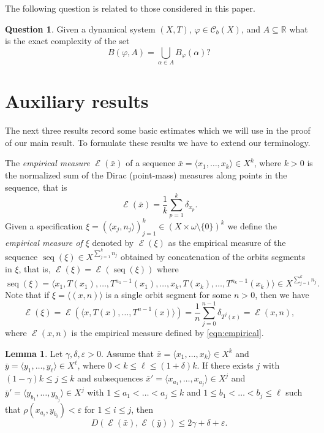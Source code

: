 \documentclass{amsart}
\theoremstyle{definition}
\newtheorem{lem}[thm]{Lemma}
\newtheorem*{ques*}{Question}
\newcommand{\cC}{\mathcal{C}}
\DeclareMathOperator{\Emp}{\mathcal{E}}%
\DeclareMathOperator{\seq}{seq}
\renewcommand{\phi}{\varphi}
\DeclareMathOperator{\MT}{\mathcal{M}_{\mathit T} }
\newcommand{\weakst}{weak$^*$}
\newcommand{\eps}{\varepsilon}
\newcommand{\R}{\mathbb{R}}
\begin{document}
The following question is related to those considered in this paper.


\begin{ques*} \label{ques:gq}
Given a dynamical system $(X,T)$, $\varphi\in \cC_b(X)$, and
$A\subseteq \R$ what is the exact complexity of the set
\[
B(\varphi,A)=\bigcup_{\alpha\in A}B_\phi(\alpha)?
\]
\end{ques*}








\section{Auxiliary results}\label{sec:aux}
The next three results record some basic estimates which we will use in the proof of our main result.
To formulate these results we have to extend our terminology.

The {\em empirical measure} $\Emp(\bar x)$ of a sequence $\bar x=\langle x_1,\ldots,x_k\rangle\in X^k$, where $k>0$
is the normalized sum of the Dirac (point-mass) measures along points in the sequence, that is
\[
\Emp(\bar x)=\frac{1}{k}\sum_{p=1}^{k}\delta_{x_p}.
\]
Given a specification $\xi=(\langle x_j,n_j\rangle)_{j=1}^k\in (X\times \omega\setminus\{0\})^k$ we define the \emph{empirical measure of $\xi$} denoted by $\Emp(\xi)$ as the empirical measure of the sequence $\seq(\xi)\in X^{\sum_{j=1}^kn_j}$ obtained by concatenation of the orbits segments in $\xi$, that is,
$\Emp(\xi)=\Emp(\seq(\xi))$  where
\[
\seq(\xi)=\langle x_1,T(x_1),\ldots, T^{n_1-1}(x_1),\ldots,x_k,T(x_k),\ldots,T^{n_k-1}(x_k)\rangle\in X^{\sum_{j=1}^kn_j}.
\]
Note that if $\xi=\langle (x,n)\rangle$ is a single orbit segment for some $n>0$, then we have
\[
\Emp(\xi)=\Emp(\langle x,T(x),\ldots, T^{n-1}(x)\rangle)=
\frac{1}{n}\sum_{j=0}^{n-1}\delta_{T^j(x)}=\Emp(x,n),
\]
where $\Emp(x,n)$ is the empirical measure defined by \eqref{eqn:empirical}.


\begin{lem}\label{lem:close-segments}
Let $\gamma,\delta,\eps>0$. Assume that
$\bar x=\langle x_1,\ldots,x_k\rangle\in X^k$ and
$\bar y=\langle y_1,\ldots,y_\ell\rangle\in X^\ell$, where $0<k\le \ell\le (1+\delta)k$.
If there exists $j$ with $(1-\gamma)k\le j\le k$ and
subsequences $\bar x'=\langle x_{a_1},\ldots,x_{a_j}\rangle\in X^j$ and
$\bar y'=\langle y_{b_1},\ldots,y_{b_j}\rangle\in X^j$ with $1\le a_1 <\ldots < a_j\le k$
and $1\le b_1 <\ldots < b_j\le \ell$
such that $\rho(x_{a_i},y_{b_i})<\eps$ for $1\le i\le j$, then
\[
D(\Emp(\bar x),\Emp(\bar y))
\le 2\gamma+\delta+\eps.
\]
\end{lem}
\end{document}
